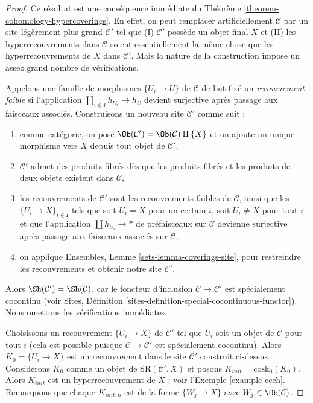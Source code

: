 \begin{proof}
Ce résultat est une conséquence immédiate du
Théorème \ref{theorem-cohomology-hypercoverings}.
En effet, on peut remplacer artificiellement $\mathcal{C}$ par un site
légèrement plus grand $\mathcal{C}'$ tel que
(I) $\mathcal{C}'$ possède un objet final $X$ et (II) les
hyperrecouvrements dans $\mathcal{C}$ soient essentiellement la
même chose que les hyperrecouvrements de $X$ dans $\mathcal{C}'$.
Mais la nature de la construction impose un assez grand nombre de
vérifications.

\medskip\noindent
Appelons une famille de morphismes $\{U_i \to U\}$ de $\mathcal{C}$
de but fixé un {\it recouvrement faible} si l'application
$\coprod_{i \in I} h_{U_i} \to h_U$ devient surjective après passage aux faisceaux associés.
Construisons un nouveau site $\mathcal{C}'$ comme suit :
\begin{enumerate}
\item comme catégorie, on pose $\Ob(\mathcal{C}') = \Ob(\mathcal{C}) \amalg \{X\}$
et on ajoute un unique morphisme vers $X$ depuis tout objet de $\mathcal{C}'$,
\item $\mathcal{C}'$ admet des produits fibrés dès que les produits fibrés et les produits
de deux objets existent dans $\mathcal{C}$,
\item les recouvrements de $\mathcal{C}'$ sont les recouvrements faibles de $\mathcal{C}$,
ainsi que les $\{U_i \to X\}_{i \in I}$ tels que soit $U_i = X$
pour un certain $i$, soit $U_i \not = X$ pour tout $i$ et que l'application
$\coprod h_{U_i} \to *$ de préfaisceaux sur $\mathcal{C}$ devienne
surjective après passage aux faisceaux associés sur $\mathcal{C}$,
\item on applique Ensembles, Lemme \ref{sets-lemma-coverings-site},
pour restreindre les recouvrements et obtenir notre site $\mathcal{C}'$.
\end{enumerate}
Alors $\Sh(\mathcal{C}') = \Sh(\mathcal{C})$, car le foncteur d'inclusion
$\mathcal{C} \to \mathcal{C}'$ est spécialement cocontinu
(voir Sites, Définition \ref{sites-definition-special-cocontinuous-functor}).
Nous omettons les vérifications immédiates.

\medskip\noindent
Choisissons un recouvrement $\{U_i \to X\}$ de $\mathcal{C}'$ tel que $U_i$ soit un
objet de $\mathcal{C}$ pour tout $i$ (cela est possible puisque
$\mathcal{C} \to \mathcal{C}'$ est spécialement cocontinu).
Alors $K_0 = \{U_i \to X\}$ est un recouvrement dans le
site $\mathcal{C}'$ construit ci-dessus. Considérons $K_0$ comme un objet de
$\text{SR}(\mathcal{C}', X)$ et posons $K_{init} = \text{cosk}_0(K_0)$.
Alors $K_{init}$ est un hyperrecouvrement de $X$ ; voir
l'Exemple \ref{example-cech}. Remarquons que chaque $K_{init, n}$ est de la forme
$\{W_j \to X\}$ avec $W_j \in \Ob(\mathcal{C})$.


\end{proof}
